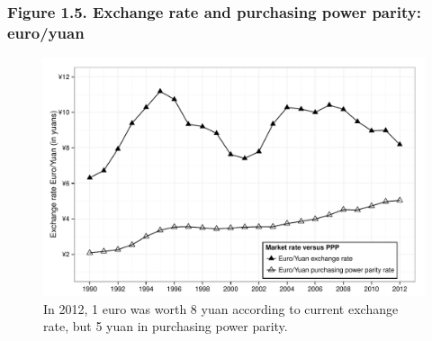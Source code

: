 \documentclass[t]{beamer}\usepackage[]{graphicx}\usepackage[]{color}
\newenvironment{knitrout}{}{} %
\begin{document}
\begin{frame}[label=Figure_1_5,fragile]
\frametitle{Figure 1.5. Exchange rate and purchasing power parity: euro/yuan}
\begin{figure}[t]
\begin{minipage}[b]{\textwidth}
\centering
\begin{knitrout}\footnotesize
{}\color{fgcolor}

{\centering \includegraphics[width=1\linewidth]{figures/bw/Figure_1_5} 

}



\end{knitrout}
\caption{In 2012, 1 euro was worth 8 yuan according to current exchange rate, but 5 yuan in purchasing power parity.}
\end{minipage}
\end{figure}
\end{frame}
\end{document}

